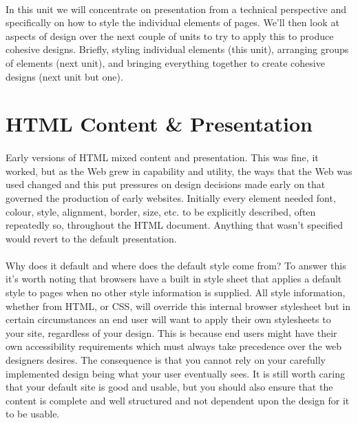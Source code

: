 \paragraph{} In this unit we will concentrate on presentation from a technical perspective and specifically on how to style the individual elements of pages. We’ll then look at aspects of design over the next couple of units to try to apply this to produce cohesive designs. Briefly, styling individual elements (this unit), arranging groups of elements (next unit), and bringing everything together to create cohesive designs (next unit but one).


\section{HTML Content \& Presentation}
\paragraph{} Early versions of HTML mixed content and presentation. This was fine, it worked, but as the Web grew in capability and utility, the ways that the Web was used changed and this put pressures on design decisions made early on that governed the production of early websites. Initially every element needed font, colour, style, alignment, border, size, etc. to be explicitly described, often repeatedly so, throughout the HTML document. Anything that wasn't specified would revert to the default presentation. 
\paragraph{} Why does it default and where does the default style come from? To answer this it's worth noting that browsers have a built in style sheet that applies a default style to pages when no other style information is supplied. All style information, whether from HTML, or CSS, will override this internal browser stylesheet but in certain circumstances an end user will want to apply their own stylesheets to your site, regardless of your design. This is because end users might have their own accessibility requirements which must always take precedence over the web designers desires. The consequence is that you cannot rely on your carefully implemented design being what your user eventually sees. It is still worth caring that your default site is good and usable, but you should also ensure that the content is complete and well structured and not dependent upon the design for it to be usable.
